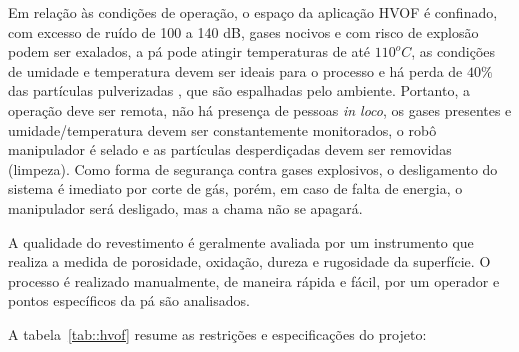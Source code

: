  

Em relação às condições de operação, o espaço da aplicação HVOF é confinado, com
excesso de ruído de 100 a 140 dB, gases nocivos e com risco de explosão podem
ser exalados, a pá pode atingir temperaturas de até $110^oC$, as condições de
umidade e temperatura devem ser ideais para o processo e há perda de $40\%$
das partículas pulverizadas  \citep{wu2006rebound}, que são espalhadas pelo
ambiente. Portanto, a operação deve ser remota, não há presença de pessoas \textit{in loco}, os gases
presentes e umidade/temperatura devem ser constantemente monitorados, o robô
manipulador é selado e as partículas desperdiçadas devem ser removidas
(limpeza). Como forma de segurança contra gases explosivos, o desligamento do
sistema é imediato por corte de gás, porém, em caso de falta de energia, o
manipulador será desligado, mas a chama não se apagará.

A qualidade do revestimento é geralmente avaliada por um instrumento que
realiza a medida de porosidade, oxidação, dureza e rugosidade da superfície. O
processo é realizado manualmente, de maneira rápida e fácil, por um operador e
pontos específicos da pá são analisados.

A tabela~\ref{tab::hvof} resume as restrições e especificações do
projeto:

